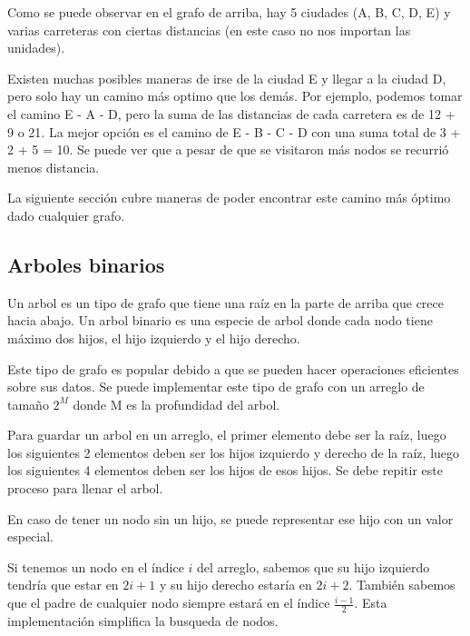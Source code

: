 \documentclass{article}
\begin{document}
Como se puede observar en el grafo de arriba, hay 5 ciudades (A, B, C, D, E) y varias carreteras con ciertas distancias (en este caso no nos importan las unidades).

Existen muchas posibles maneras de irse de la ciudad E y llegar a la ciudad D, pero solo hay un camino más optimo que los demás. Por ejemplo, podemos tomar el camino E - A - D, pero la suma de las distancias de cada carretera es de 12 + 9 o 21. La mejor opción es el camino de E - B - C - D con una suma total de 3 + 2 + 5 = 10. Se puede ver que a pesar de que se visitaron más nodos se recurrió menos distancia.

La siguiente sección cubre maneras de poder encontrar este camino más óptimo dado cualquier grafo.

\subsection{Arboles binarios}

Un arbol es un tipo de grafo que tiene una raíz en la parte de arriba que crece hacia abajo. Un arbol binario es una especie de arbol donde cada nodo tiene máximo dos hijos, el hijo izquierdo y el hijo derecho.

Este tipo de grafo es popular debido a que se pueden hacer operaciones eficientes sobre sus datos. Se puede implementar este tipo de grafo con un arreglo de tamaño $2^M$ donde M es la profundidad del arbol.

Para guardar un arbol en un arreglo, el primer elemento debe ser la raíz, luego los siguientes 2 elementos deben ser los hijos izquierdo y derecho de la raíz, luego los siguientes 4 elementos deben ser los hijos de esos hijos. Se debe repitir este proceso para llenar el arbol.

En caso de tener un nodo sin un hijo, se puede representar ese hijo con un valor especial.

Si tenemos un nodo en el índice $i$ del arreglo, sabemos que su hijo izquierdo tendría que estar en $2i + 1$ y su hijo derecho estaría en $2i + 2$. También sabemos que el padre de cualquier nodo siempre estará en el índice $\frac{i - 1}{2}$. Esta implementación simplifica la busqueda de nodos.
\end{document}
